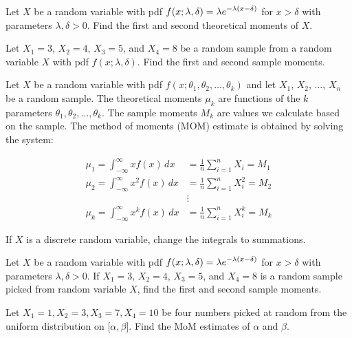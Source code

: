 
  \bb
  \ii Let $X$ be a random variable with pdf $\displaystyle f(x; \lambda, \delta)=\lambda e^{-\lambda(x-\delta)}$ for $x > \delta$ with parameters $\lambda, \delta >0$. Find the first and second theoretical moments of $X$.  \vfill

  
\ii Let $X_1=3$, $X_2=4$, $X_3 = 5$, and $X_4 = 8$ be a random sample from a random variable $X$ with pdf $f(x; \lambda, \delta)$. Find the first and second sample moments. \label{sample} \vfill
\ee


\bbox
Let $X$ be a random variable with pdf $f(x; \theta_1, \theta_2, \ldots, \theta_k)$ and let $X_1$, $X_2$, $\ldots$, $X_n$ be a random
sample.
\bi
\ii The theoretical moments $\mu_k$ are functions of the $k$ parameters $\theta_1, \theta_2, \ldots, \theta_k$.
\ii The sample moments $M_k$ are values we calculate based on the sample.
\ii The \alert{method of moments (MOM) estimate} is obtained by solving the system:
\ei

\begin{align*}
\mu_1 = \int_{-\infty}^{\infty} xf(x) \, dx &= \frac{1}{n} \sum_{i=1}^n X_i = M_1\\
\mu_2 = \int_{-\infty}^{\infty} x^2f(x) \, dx &= \frac{1}{n} \sum_{i=1}^n X_i^2 = M_2\\
& \vdots \\
\mu_k = \int_{-\infty}^{\infty} x^kf(x) \, dx &= \frac{1}{n} \sum_{i=1}^n X_i^k = M_k
\end{align*}

If $X$ is a discrete random variable, change the integrals to summations.
\ebox

\clearpage

  
\bb[resume]
\ii Let $X$ be a random variable with pdf $\displaystyle f(x; \lambda, \delta)=\lambda e^{-\lambda(x-\delta)}$ for $x > \delta$ with parameters $\lambda, \delta >0$. If $X_1=3$, $X_2=4$, $X_3 = 5$, and $X_4 = 8$ is a random sample picked from random variable $X$, find the first and second sample moments. \label{sample} \vfill

\ii Let $X_1=1, X_2=3, X_3=7, X_4=10$ be four numbers picked at random from the uniform distribution on $\lbrack \alpha , \beta \rbrack$. Find the MoM estimates of $\alpha$ and $\beta$. \vfill

\ee

\clearpage



